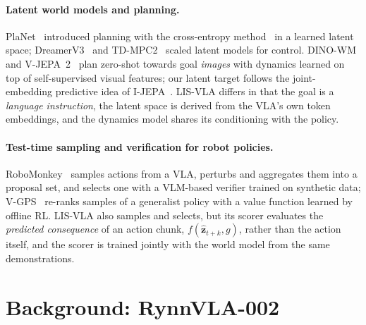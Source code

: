 \documentclass[11pt]{article}
\newcommand{\zhat}{\hat{\bm{z}}_{t+k}}
\begin{document}
\paragraph{Latent world models and planning.}
PlaNet~\citep{hafner2018planet} introduced planning with the cross-entropy method~\citep{rubinstein2004cem} in a learned latent space; DreamerV3~\citep{hafner2023dreamerv3} and TD-MPC2~\citep{hansen2023tdmpc2} scaled latent models for control. DINO-WM~\citep{zhou2024dinowm} and V-JEPA~2~\citep{assran2025vjepa2} plan zero-shot towards goal \emph{images} with dynamics learned on top of self-supervised visual features; our latent target follows the joint-embedding predictive idea of I-JEPA~\citep{assran2023ijepa}. LIS-VLA differs in that the goal is a \emph{language instruction}, the latent space is derived from the VLA's own token embeddings, and the dynamics model shares its conditioning with the policy.

\paragraph{Test-time sampling and verification for robot policies.}
RoboMonkey~\citep{kwok2025robomonkey} samples actions from a VLA, perturbs and aggregates them into a proposal set, and selects one with a VLM-based verifier trained on synthetic data; V-GPS~\citep{nakamoto2024vgps} re-ranks samples of a generalist policy with a value function learned by offline RL. LIS-VLA also samples and selects, but its scorer evaluates the \emph{predicted consequence} of an action chunk, $f(\zhat, g)$, rather than the action itself, and the scorer is trained jointly with the world model from the same demonstrations.

\section{Background: RynnVLA-002}
\label{sec:background}
\end{document}
